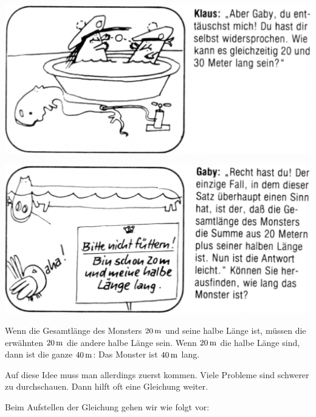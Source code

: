 \documentclass[%
11pt,%
twoside,%
titlepage,%
german,%
]{scrartcl}
\begin{document}
\medskip
\noindent\includegraphics[width=\columnwidth,bb=14 14 946 468]{pictures/lochness3t.eps}

\enlargethispage{1ex}

\medskip
\noindent\includegraphics[width=\columnwidth,bb=14 14 950 469]{pictures/lochness4t.eps}

\label{lingl:ohnegl}

Wenn die Gesamtl\"ange des Monsters $\unit[20]{m}$ und seine halbe L\"ange ist, m\"ussen die erw\"ahnten $\unit[20]{m}$ die andere halbe L\"ange sein. Wenn $\unit[20]{m}$ die halbe L\"ange sind, dann ist die ganze $\unit[40]{m}$: Das Monster ist $\unit[40]{m}$ lang.

Auf diese Idee muss man allerdings zuerst kommen. Viele Probleme sind schwerer zu durchschauen. Dann hilft oft eine Gleichung weiter.

\label{lingl:gl}

Beim Aufstellen der Gleichung gehen wir wie folgt vor:
\end{document}
